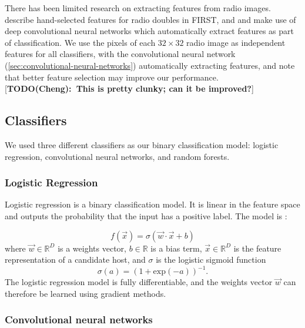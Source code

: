 \documentclass[fleqn,usenatbib,usedcolumn]{mnras}
\newcommand{\matthew}[2]{ {\color{white!20!violet}[{\bf TODO(#1):~{#2}}]} }
\begin{document}
    There has been limited research on extracting features from radio images.
    \citet{proctor06} describe hand-selected features for radio doubles in
    FIRST, and \citet{aniyan17cnn} and \citet{lukic17compact} make use of deep
    convolutional neural networks which automatically extract features as part
    of classification. We use the pixels of each $32 \times 32$ radio image as
    independent features for all classifiers, with the convolutional neural
    network (\autoref{sec:convolutional-neural-networks}) automatically
    extracting features, and note that better feature selection may improve our
    performance. \matthew{Cheng}{This is pretty clunky; can it be improved?}

  \subsection{Classifiers}\label{sec:classifiers}

    We used three different classifiers as our binary classification model:
    logistic regression, convolutional neural networks, and random forests.

    \subsubsection{Logistic Regression}
    \label{sec:logistic-regression}
      Logistic regression is a binary classification model. It is linear in the
      feature space and outputs the probability that the input has a positive
      label. The model is \citep{bishop06ml}:

      \begin{equation}
          f(\vec x) = \sigma(\vec w \cdot \vec x + b)
      \end{equation}
      where $\vec w \in \mathbb{R}^D$ is a weights vector,
      $b \in \mathbb{R}$ is a bias term, $\vec x \in \mathbb{R}^D$ is the
      feature representation of a candidate host, and $\sigma$ is the
      logistic sigmoid function \begin{equation}
          \sigma(a) = (1 + \mathrm{exp}(-a))^{-1}.
      \end{equation}%
      The logistic regression model is fully differentiable, and the weights
      vector $\vec w$ can therefore be learned using gradient methods.

    \subsubsection{Convolutional neural networks}
    \label{sec:convolutional-neural-networks}
\end{document}
